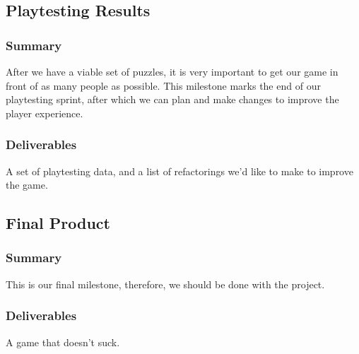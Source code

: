 \subsection{Playtesting Results}
\subsubsection*{Summary}
After we have a viable set of puzzles, it is very important to get our game in
front of as many people as possible. This milestone marks the end of our
playtesting sprint, after which we can plan and make changes to improve the
player experience.
\subsubsection*{Deliverables}
A set of playtesting data, and a list of refactorings we’d like to make to
improve the game.

\subsection{Final Product}
\subsubsection*{Summary}
This is our final milestone, therefore, we should be done with the project.
\subsubsection*{Deliverables}
A game that doesn’t suck.
